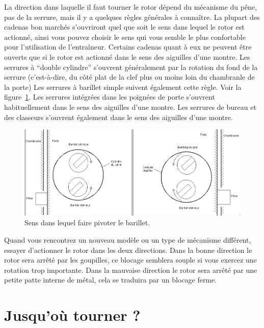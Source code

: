 \documentclass[a4paper,french,11pt,twoside]{report}
\begin{document}
La direction dans laquelle il faut tourner le rotor dépend du mécanisme du pêne, pas de la serrure, mais il y a quelques règles générales à connaître. La plupart des cadenas bon marchés s'ouvriront quel que soit le sens dans lequel le rotor est actionné, ainsi vous pouvez choisir le sens qui vous semble le plus confortable pour l'utilisation de l'entraîneur. Certains cadenas quant à eux ne peuvent être ouverts que si le rotor est actionné dans le sens des aiguilles d'une montre. Les serrures à \enquote{double cylindre} s'ouvrent généralement par la rotation du fond de la serrure (c'est-à-dire, du côté plat de la clef plus ou moins loin du chambranle de la porte) Les serrures à barillet simple suivent également cette règle. Voir la figure~\ref{sens_barillet}. Les serrures intégrées dans les poignées de porte s'ouvrent habituellement dans le sens des aiguilles d'une montre. Les serrures de bureau et des classeurs s'ouvrent également dans le sens des aiguilles d'une montre.


\begin{figure}[h]
  \begin{center}
    \includegraphics[width=16cm]{images/Image16_17.png}
    \caption{Sens dans lequel faire pivoter le barillet.\label{sens_barillet}}
  \end{center}
\end{figure}


Quand vous rencontrez un nouveau modèle ou un type de mécanisme différent, essayer d'actionner le rotor dans les deux directions. Dans la bonne direction le rotor sera arrêté par les goupilles, ce blocage semblera souple si vous exercez une rotation trop importante. Dans la mauvaise direction le rotor sera arrêté par une petite patte interne de métal, cela se traduira par un blocage ferme.

\section{Jusqu'où tourner ?}
\end{document}
